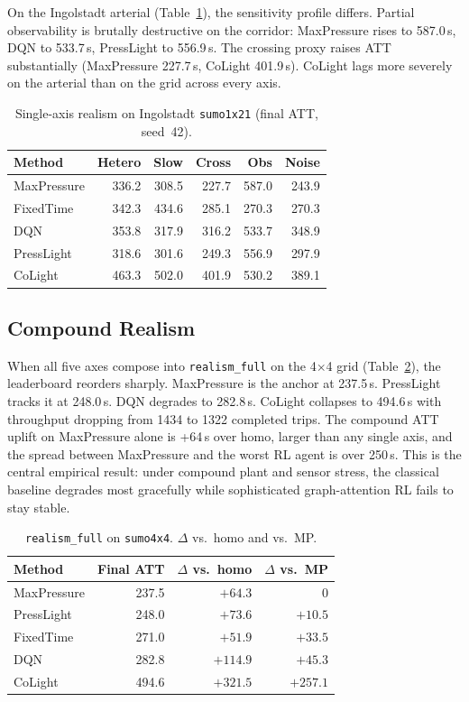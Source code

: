 \documentclass[conference]{IEEEtran}
\newcommand{\realismfull}{\texttt{realism\_full}}
\begin{document}
On the Ingolstadt arterial (Table~\ref{tab:axes1x21}), the sensitivity profile differs. Partial observability is brutally destructive on the corridor: MaxPressure rises to 587.0\,s, DQN to 533.7\,s, PressLight to 556.9\,s. The crossing proxy raises ATT substantially (MaxPressure 227.7\,s, CoLight 401.9\,s). CoLight lags more severely on the arterial than on the grid across every axis.

\begin{table}[t]
\centering
\caption{Single-axis realism on Ingolstadt \texttt{sumo1x21} (final ATT, seed~42).}
\label{tab:axes1x21}
\setlength{\tabcolsep}{3.5pt}
\begin{tabular}{lrrrrr}
\toprule
Method & Hetero & Slow & Cross & Obs & Noise \\
\midrule
MaxPressure & 336.2 & 308.5 & 227.7 & 587.0 & 243.9 \\
FixedTime   & 342.3 & 434.6 & 285.1 & 270.3 & 270.3 \\
DQN         & 353.8 & 317.9 & 316.2 & 533.7 & 348.9 \\
PressLight  & 318.6 & 301.6 & 249.3 & 556.9 & 297.9 \\
CoLight     & 463.3 & 502.0 & 401.9 & 530.2 & 389.1 \\
\bottomrule
\end{tabular}
\end{table}

\subsection{Compound Realism}

When all five axes compose into \realismfull{} on the 4$\times$4 grid (Table~\ref{tab:full4x4}), the leaderboard reorders sharply. MaxPressure is the anchor at 237.5\,s. PressLight tracks it at 248.0\,s. DQN degrades to 282.8\,s. CoLight collapses to 494.6\,s with throughput dropping from 1434 to 1322 completed trips. The compound ATT uplift on MaxPressure alone is +64\,s over homo, larger than any single axis, and the spread between MaxPressure and the worst RL agent is over 250\,s. This is the central empirical result: under compound plant and sensor stress, the classical baseline degrades most gracefully while sophisticated graph-attention RL fails to stay stable.

\begin{table}[t]
\centering
\caption{\realismfull{} on \texttt{sumo4x4}. $\Delta$ vs.\ homo and vs.\ MP.}
\label{tab:full4x4}
\begin{tabular}{lrrr}
\toprule
Method & Final ATT & $\Delta$ vs.\ homo & $\Delta$ vs.\ MP \\
\midrule
MaxPressure & 237.5 & $+64.3$ & $0$ \\
PressLight  & 248.0 & $+73.6$ & $+10.5$ \\
FixedTime   & 271.0 & $+51.9$ & $+33.5$ \\
DQN         & 282.8 & $+114.9$ & $+45.3$ \\
CoLight     & 494.6 & $+321.5$ & $+257.1$ \\
\bottomrule
\end{tabular}
\end{table}
\end{document}
